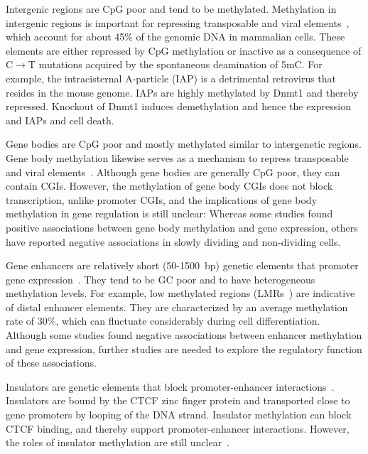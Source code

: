 Intergenic regions are CpG poor and tend to be methylated. Methylation in intergenic regions is important for repressing transposable and viral elements~\citep{moore_dna_2013,jones_functions_2012,robertson_dna_2005}, which account for about 45\% of the genomic DNA in mammalian cells. These elements are either repressed by CpG methylation or inactive as a consequence of C$\rightarrow$T mutations acquired by the spontaneous deamination of 5mC. For example, the intracisternal A-particle (IAP) is a detrimental retrovirus that resides in the mouse genome. IAPs are highly methylated by Dnmt1 and thereby repressed. Knockout of Dnmt1 induces demethylation and hence the expression and IAPs and cell death.

Gene bodies are CpG poor and mostly methylated similar to intergenetic regions. Gene body methylation likewise serves as a mechanism to repress transposable and viral elements~\citep{moore_dna_2013,jones_functions_2012,robertson_dna_2005}. Although gene bodies are generally CpG poor, they can contain CGIs. However, the methylation of gene body CGIs does not block transcription, unlike promoter CGIs, and the implications of gene body methylation in gene regulation is still unclear: Whereas some studies found positive associations between gene body methylation and gene expression, others have reported negative associations in slowly dividing and non-dividing cells.

Gene enhancers are relatively short (50-1500~bp) genetic elements that promoter gene expression~\citep{blackwood_going_1998,pennacchio_enhancers:_2013}. They tend to be GC poor and to have heterogeneous methylation levels. For example, low methylated regions (LMRs~\citep{stadler_dna-binding_2011}) are indicative of distal enhancer elements. They are characterized by an average methylation rate of 30\%, which can fluctuate considerably during cell differentiation. Although some studies found negative associations between enhancer methylation and gene expression, further studies are needed to explore the regulatory function of these associations.

Insulators are genetic elements that block promoter-enhancer interactions~\citep{burgess-beusse_insulation_2002}. Insulators are bound by the CTCF zinc finger protein and transported close to gene promoters by looping of the DNA strand. Insulator methylation can block CTCF binding, and thereby support promoter-enhancer interactions. However, the roles of insulator methylation are still unclear~\citep{moore_dna_2013,jones_functions_2012}.


